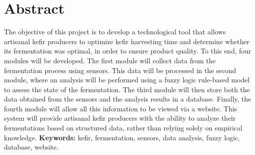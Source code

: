 \section*{Abstract}

The objective of this project is to develop a technological tool that allows 
artisanal kefir producers to optimize kefir harvesting time and determine whether 
its fermentation was optimal, in order to ensure product quality. To this end, 
four modules will be developed. The first module will collect data from the fermentation 
process using sensors. This data will be processed in the second module, where an analysis 
will be performed using a fuzzy logic rule-based model to assess the state of the 
fermentation. The third module will then store both the data obtained from the sensors 
and the analysis results in a database. Finally, the fourth module will allow all this 
information to be viewed via a website. This system will provide artisanal kefir producers 
with the ability to analyze their fermentations based on structured data, rather than 
relying solely on empirical knowledge.
\newline
\newline
\noindent \textbf{Keywords:} kefir, fermentation, sensors, data analysis, fuzzy logic, database, website.